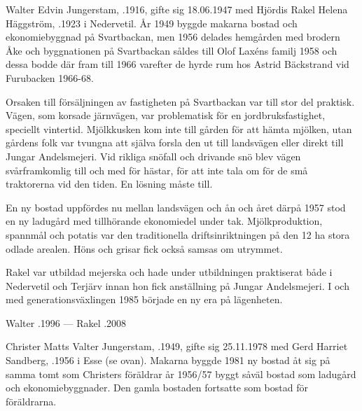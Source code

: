 %
Walter Edvin Jungerstam, .1916, gifte sig 18.06.1947 med Hjördis Rakel Helena Häggström, .1923 i Nedervetil. År 1949 byggde makarna bostad och ekonomiebyggnad på Svartbackan, men 1956 delades hemgården med brodern Åke och byggnationen på Svartbackan såldes till Olof Laxéns familj 1958 och dessa bodde där fram till 1966 varefter de hyrde rum hos Astrid Bäckstrand vid Furubacken 1966-68.

Orsaken till försäljningen av fastigheten på Svartbackan var till stor del praktisk. Vägen, som korsade järnvägen, var problematisk för en jordbruksfastighet, speciellt vintertid. Mjölkkusken kom inte till gården för att hämta mjölken, utan gårdens folk var tvungna att själva forsla den ut till landsvägen eller direkt till Jungar Andelsmejeri. Vid rikliga snöfall och drivande snö blev vägen svårframkomlig till och med för hästar, för att inte tala om för de små traktorerna vid den tiden. En lösning måste till.

En ny bostad uppfördes nu mellan landsvägen och ån och året därpå 1957 stod en ny ladugård med tillhörande ekonomiedel under tak. Mjölkproduktion, spannmål och potatis var den traditionella driftsinriktningen på den 12 ha stora odlade arealen. Höns och grisar fick också samsas om utrymmet.

Rakel var utbildad mejerska och hade under utbildningen praktiserat både i Nedervetil och Terjärv innan hon fick anställning på Jungar Andelsmejeri. I och med generationsväxlingen 1985 började en ny era på lägenheten.
\begin{jhchildren}
  \item {}
  \item {}
\end{jhchildren}

Walter .1996  ---  Rakel .2008



%



%
Christer Matts Valter Jungerstam, .1949, gifte sig 25.11.1978 med Gerd Harriet Sandberg, .1956 i Esse (se ovan). Makarna byggde 1981 ny bostad åt sig på samma tomt som Christers föräldrar år 1956/57 byggt såväl bostad som ladugård och ekonomiebyggnader. Den gamla bostaden fortsatte som bostad för föräldrarna.

